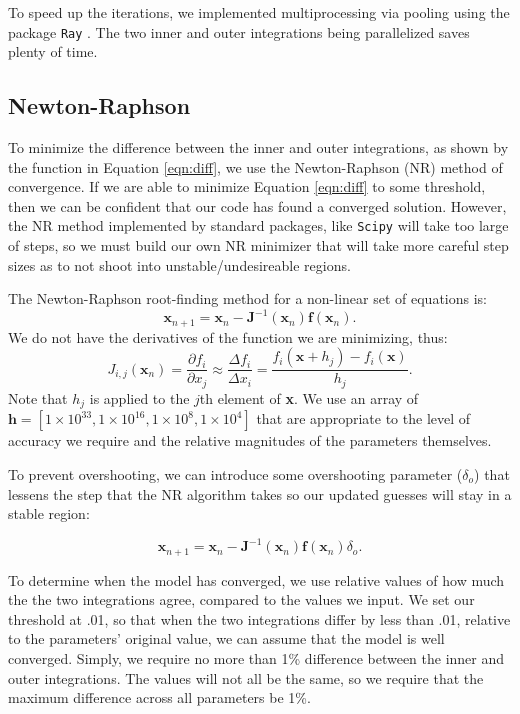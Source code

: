 \documentclass[twocolumn]{aastex631}
\begin{document}
To speed up the iterations, we implemented multiprocessing via pooling using the package \texttt{Ray} \citep{ray}. The two inner and outer integrations being parallelized saves plenty of time.

\subsection{Newton-Raphson}

To minimize the difference between the inner and outer integrations, as shown by the function in Equation \ref{eqn:diff}, we use the Newton-Raphson (NR) method of convergence. If we are able to minimize Equation \ref{eqn:diff} to some threshold, then we can be confident that our code has found a converged solution. However, the NR method implemented by standard packages, like \texttt{Scipy} will take too large of steps, so we must build our own NR minimizer that will take more careful step sizes as to not shoot into unstable/undesireable regions. 

The Newton-Raphson root-finding method for a non-linear set of equations is:
\begin{equation}
	\textbf{x}_{n+1} = \textbf{x}_n - \textbf{J}^{-1}(\textbf{x}_n)\textbf{f}\left(\textbf{x}_n\right).
\end{equation}
We do not have the derivatives of the function we are minimizing, thus:
\begin{equation}
	J_{i,j}(\textbf{x}_n) = \frac{\partial f_i}{\partial x_j} \approx \frac{\Delta f_i}{\Delta x_i} = \frac{f_i(\textbf{x} + h_j) - f_i(\textbf{x})}{h_j}.
\end{equation}
Note that $h_j$ is applied to the $j$th element of \textbf{x}. We use an array of $\textbf{h} = [1\times 10^{33}, 1\times10^{16}, 1\times 10^8, 1\times 10^4]$ that are appropriate to the level of accuracy we require and the relative magnitudes of the parameters themselves. 

To prevent overshooting, we can introduce some overshooting parameter ($\delta_o$) that lessens the step that the NR algorithm takes so our updated guesses will stay in a stable region:

\begin{equation}
	\textbf{x}_{n+1} = \textbf{x}_n - \textbf{J}^{-1}(\textbf{x}_n)\textbf{f}\left(\textbf{x}_n\right)\delta_o.
\end{equation}

To determine when the model has converged, we use relative values of how much the the two integrations agree, compared to the values we input. We set our threshold at .01, so that when the two integrations differ by less than .01, relative to the parameters' original value, we can assume that the model is well converged. Simply, we require no more than 1\% difference between the inner and outer integrations. The values will not all be the same, so we require that the maximum difference across all parameters be 1\%.
\end{document}
